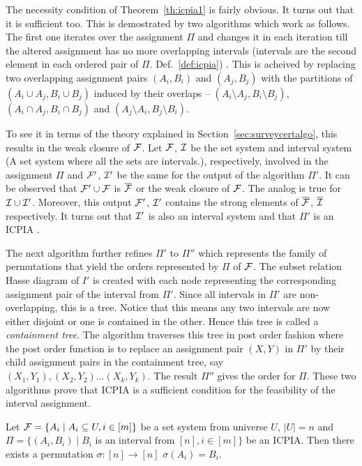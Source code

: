 The necessity condition of Theorem~\ref{th:icpia1} is fairly
obvious. It turns out that it is sufficient too.  This is demostrated
by two algorithms which work as follows. The first one iterates over
the assignment $\Pi$ %
and changes it in each iteration till the altered
assignment %
has no more overlapping intervals (intervals are the second
  element in each ordered pair of $\Pi$. Def.~\ref{def:icpia}) %
\cite[Alg.~1]{nsnrs09}. This is acheived by replacing two overlapping
assignment pairs $(A_i, B_i)$ and $(A_j, B_j)$ with the partitions of
$(A_i \cup A_j,B_i \cup B_j)$ induced by their overlaps -- $(A_i
\setminus A_j, B_i \setminus B_j)$, $(A_i \cap A_j, B_i \cap B_j)$ and
$(A_j \setminus A_i, B_j \setminus B_i)$.

To see it in terms of the theory explained in
Section~\ref{sec:surveycertalgo}, this results in the weak closure of
${\cal F}$. Let ${\cal F}$, ${\cal I}$ be the set system and interval
system (A set system where all the sets are intervals.),
respectively, involved in the assignment $\Pi$ and ${\cal F}'$, ${\cal I}'$ be
the same for the output of the algorithm $\Pi'$.  It can be observed
that ${\cal F}' \cup {\cal F}$ is $\overline{{\cal F}}$ or the weak closure of
${\cal F}$. The analog is true for ${\cal I} \cup {\cal I}'$.  Moreover, this output
${\cal F}'$, ${\cal I}'$ contains the strong elements of $\overline{{\cal F}}$,
$\overline{{\cal I}}$ respectively. It turns out that ${\cal I}'$ is also an
interval system and that $\Pi'$ is an ICPIA \cite[Lem.~2]{nsnrs09}.

The next algorithm \cite[Alg.~2]{nsnrs09} further refines $\Pi'$ to
$\Pi''$ which represents the family of permutations that yield the
\COP orders represented by $\Pi$ of ${\cal F}$. The subset relation Hasse
diagram of $I'$ is created with each node representing the
corresponding assignment pair of the interval from $\Pi'$. Since all intervals in
$\Pi'$ are non-overlapping, this is a tree. Notice that this means any
two intervals are now either disjoint or one is contained in the
other. Hence this tree is called a {\em containment tree}.  The
algorithm traverses this tree in post order fashion where the post
order function is to replace an assignment pair $(X,Y)$  in $\Pi'$ by their child
assignment pairs in the containment tree, say $(X_1, Y_1),(X_2, Y_2)
\ldots (X_k,Y_k)$. The result $\Pi''$ gives the
\COP order for $\Pi$. These two algorithms prove that ICPIA is a
sufficient condition for the feasibility of the interval assignment.

\begin{theoremsansproof}
  \label{th:icpia2}
  Let  ${\cal F} = \{A_i \mid A_i \subseteq U, i \in [m]\}$ be a set system
  from universe $U$, $|U| = n$
  and $\Pi = \{(A_i,B_i) \mid B_i \text{ is an interval from } [n], i
  \in [m]\}$ be an ICPIA. Then there exists a permutation $\sigma: [n]
  \rightarrow [n]$ \stt $\sigma(A_i) = B_i$.
\end{theoremsansproof}

